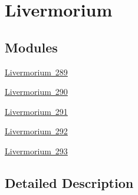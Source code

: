 \hypertarget{group___isotope_const-_livermorium}{}\section{Livermorium}
\label{group___isotope_const-_livermorium}
\subsection*{Modules}
\begin{DoxyCompactItemize}
\item 
\mbox{\hyperlink{group___isotope_const-_livermorium-_lv289}{Livermorium 289}}
\item 
\mbox{\hyperlink{group___isotope_const-_livermorium-_lv290}{Livermorium 290}}
\item 
\mbox{\hyperlink{group___isotope_const-_livermorium-_lv291}{Livermorium 291}}
\item 
\mbox{\hyperlink{group___isotope_const-_livermorium-_lv292}{Livermorium 292}}
\item 
\mbox{\hyperlink{group___isotope_const-_livermorium-_lv293}{Livermorium 293}}
\end{DoxyCompactItemize}


\subsection{Detailed Description}
